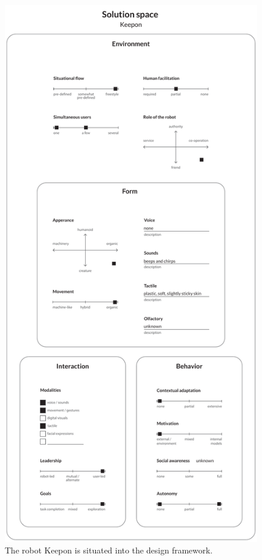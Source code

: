 \begin{figure}
\centering
  \includegraphics[scale=0.40]{images/solution_keepon-01.pdf}
  \caption{The robot Keepon is situated into the design framework.}
  \label{fig:keeponDesign}
\end{figure}

